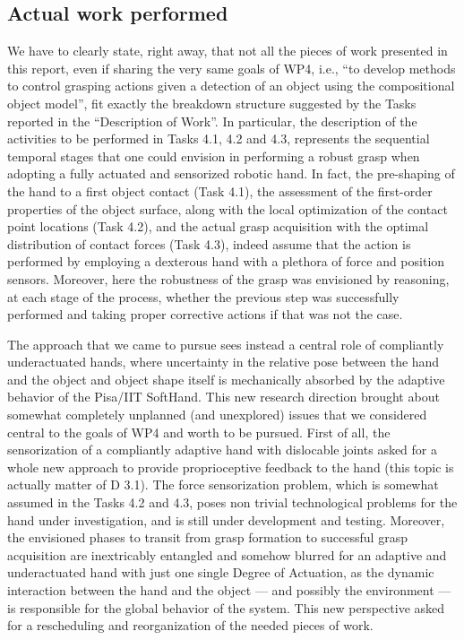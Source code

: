 \documentclass[a4paper,11pt,pdf]{pacmanreport}
\begin{document}
\subsection{Actual work performed}

We have to clearly state, right away, that not all the pieces of work presented in this report, even if sharing the very same goals of WP4, i.e., ``to develop methods to control grasping actions given a detection of an object using the compositional object model'', fit exactly the breakdown structure suggested by the Tasks reported in the ``Description of Work''. In particular, the description of the activities to be performed in Tasks 4.1, 4.2 and 4.3, represents the sequential temporal stages that one could envision in performing a robust grasp when adopting a fully actuated and sensorized robotic hand. In fact, the pre-shaping of the hand to a first object contact (Task 4.1), the assessment of the first-order properties of the object surface, along with the local optimization of the contact point locations (Task 4.2), and the actual grasp acquisition with the optimal distribution of contact forces (Task 4.3), indeed assume that the action is performed by employing a dexterous hand with a plethora of force and position sensors. Moreover, here the robustness of the grasp was envisioned by reasoning, at each stage of the process, whether the previous step was successfully performed and taking proper corrective actions if that was not the case.

The approach that we came to pursue sees instead a central role of compliantly underactuated hands, where uncertainty in the relative pose between the hand and the object and object shape itself is mechanically absorbed by the adaptive behavior of the Pisa/IIT SoftHand. This new research direction brought about somewhat completely unplanned (and unexplored) issues that we considered central to the goals of WP4 and worth to be pursued. First of all, the sensorization of a compliantly adaptive hand with dislocable joints asked for a whole new approach to provide proprioceptive feedback to the hand (this topic is actually matter of D 3.1). The force sensorization problem, which is somewhat assumed in the Tasks 4.2 and 4.3, poses non trivial technological problems for the hand under investigation, and is still under development and testing. Moreover, the envisioned phases to transit from grasp formation to successful grasp acquisition are inextricably entangled and somehow blurred for an adaptive and underactuated hand with just one single Degree of Actuation, as the dynamic interaction between the hand and the object --- and possibly the environment --- is responsible for the global behavior of the system. This new perspective asked for a rescheduling and reorganization of the needed pieces of work.
\end{document}

